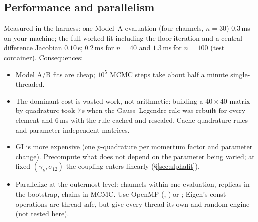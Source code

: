 \documentclass[11pt,a4paper]{article}
\numberwithin{equation}{section}
\theoremstyle{definition}
\theoremstyle{plain}
\theoremstyle{remark}
\numberwithin{algorithm}{section}
\begin{document}
\subsection{Performance and parallelism}\label{sec:bp-perf}
Measured in the harness: one Model~A evaluation (four channels, $n=30$) $0.3\,$ms on your machine; the full worked fit including the floor iteration and a central-difference Jacobian $0.10\,$s;  $0.2\,$ms for $n=40$ and $1.3\,$ms for $n=100$ (test container). Consequences:
\begin{itemize}[leftmargin=1.3em,itemsep=2pt]
\item Model A/B fits are cheap; $10^5$ MCMC steps take about half a minute single-threaded.
\item The dominant cost is wasted work, not arithmetic: building a $40\times40$ matrix by quadrature took $7\,$s when the Gauss--Legendre rule was rebuilt for every element and $6\,$ms with the rule cached and rescaled. Cache quadrature rules and parameter-independent matrices.
\item GI is more expensive (one $p$-quadrature per momentum factor and parameter change). Precompute what does not depend on the parameter being varied; at fixed $(\gamma_k,\sigma_{12})$ the coupling enters linearly (\S\ref{sec:alphafit}).
\item Parallelize at the outermost level: channels within one evaluation, replicas in the bootstrap, chains in MCMC. Use OpenMP (, ) or ; Eigen's const operations are thread-safe, but give every thread its own  and random engine (not tested here).
\end{itemize}

\end{document}
